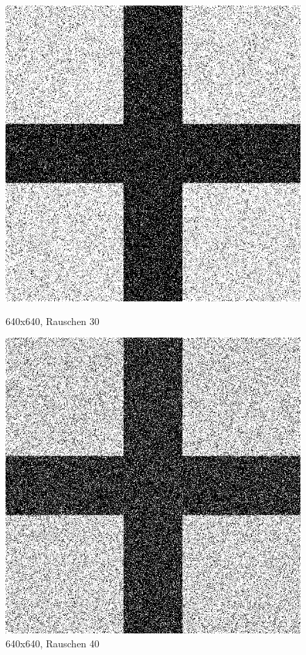 \begin{figure}[hbt]
	\begin{minipage}{0.5 \textwidth}
		\includegraphics[width=\textwidth]{./Bilder/Auswertung/BeispielBilder/Picture_Crossing_noise_30_pixelCnt_128_featureCnt_5}
		\caption{640x640, Rauschen 30}
	\end{minipage}
	\hfill
	\begin{minipage}{0.5 \textwidth}
		\includegraphics[width=\textwidth]{./Bilder/Auswertung/BeispielBilder/Picture_Crossing_noise_40_pixelCnt_128_featureCnt_5}
		\caption{640x640, Rauschen 40}
	\end{minipage}
\end{figure}

